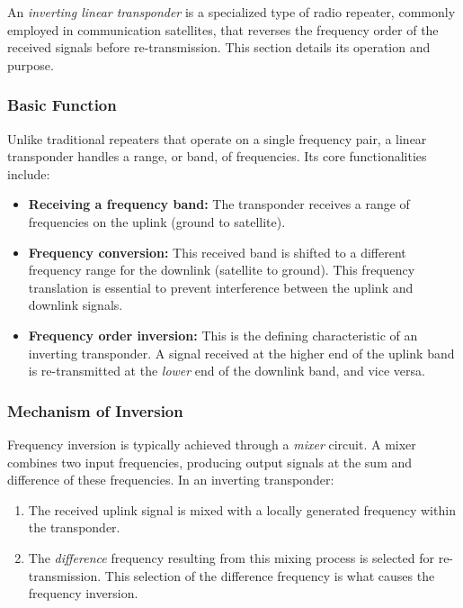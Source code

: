 An \textit{inverting linear transponder} is a specialized type of radio repeater, commonly employed in communication satellites, that reverses the frequency order of the received signals before re-transmission. This section details its operation and purpose.

\subsubsection*{Basic Function}

Unlike traditional repeaters that operate on a single frequency pair, a linear transponder handles a range, or band, of frequencies. Its core functionalities include:

\begin{itemize}
    \item \textbf{Receiving a frequency band:} The transponder receives a range of frequencies on the uplink (ground to satellite).
    \item \textbf{Frequency conversion:} This received band is shifted to a different frequency range for the downlink (satellite to ground). This frequency translation is essential to prevent interference between the uplink and downlink signals.
    \item \textbf{Frequency order inversion:} This is the defining characteristic of an inverting transponder. A signal received at the higher end of the uplink band is re-transmitted at the \textit{lower} end of the downlink band, and vice versa.
\end{itemize}

\subsubsection*{Mechanism of Inversion}

Frequency inversion is typically achieved through a \textit{mixer} circuit. A mixer combines two input frequencies, producing output signals at the sum and difference of these frequencies. In an inverting transponder:

\begin{enumerate}
    \item The received uplink signal is mixed with a locally generated frequency within the transponder.
    \item The \textit{difference} frequency resulting from this mixing process is selected for re-transmission. This selection of the difference frequency is what causes the frequency inversion.
\end{enumerate}


